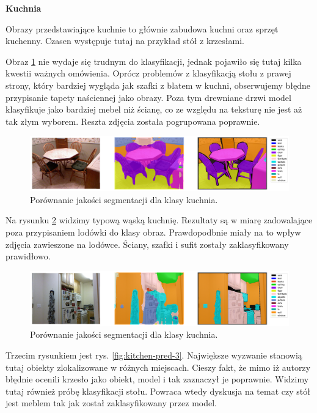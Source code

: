 \noindent
\textbf{Kuchnia}

Obrazy przedstawiające kuchnie to głównie zabudowa kuchni oraz sprzęt kuchenny. Czasen występuje tutaj na przykład stół z krzesłami.

Obraz \ref{fig:kitchen-pred-1} nie wydaje się trudnym do klasyfikacji, jednak pojawiło się tutaj kilka kwestii ważnych omówienia. Oprócz problemów z klasyfikacją stołu z prawej strony, który bardziej wygląda jak szafki z blatem w kuchni, obserwujemy błędne przypisanie tapety naściennej jako obrazy. Poza tym drewniane drzwi model klasyfikuje jako bardziej mebel niż ścianę, co ze względu na teksturę nie jest aż tak złym wyborem. Reszta zdjęcia została pogrupowana poprawnie.

\begin{figure}[ht!]
    \centering
    \includegraphics[width=\textwidth]{img/preds_analysis/gt_vs_pred/kitchen-1.png}
    \caption{Porównanie jakości segmentacji dla klasy kuchnia.}
    \label{fig:kitchen-pred-1}
\end{figure}

Na rysunku \ref{fig:kitchen-pred-2} widzimy typową wąską kuchnię. Rezultaty są w miarę zadowalające poza przypisaniem lodówki do klasy obraz. Prawdopodbnie miały na to wpływ zdjęcia zawieszone na lodówce. Ściany, szafki i sufit zostały zaklasyfikowany prawidłowo.

\begin{figure}[ht!]
    \centering
    \includegraphics[width=\textwidth]{img/preds_analysis/gt_vs_pred/kitchen-2.png}
    \caption{Porównanie jakości segmentacji dla klasy kuchnia.}
    \label{fig:kitchen-pred-2}
\end{figure}

Trzecim rysunkiem jest rys. \ref{fig:kitchen-pred-3}. Największe wyzwanie stanowią tutaj obiekty zlokalizowane w różnych miejscach. Cieszy fakt, że mimo iż autorzy błędnie ocenili krzesło jako obiekt, model i tak zaznaczył je poprawnie. Widzimy tutaj również próbę klasyfikacji stołu. Powraca wtedy dyskusja na temat czy stół jest meblem tak jak został zaklasyfikowany przez model.

